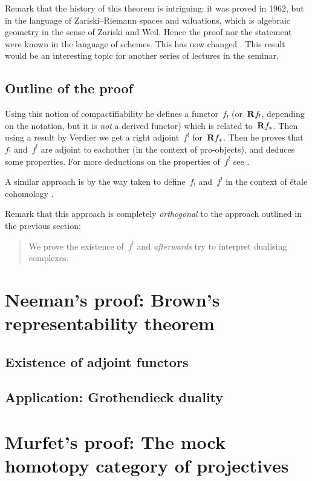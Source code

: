 \documentclass[10pt,a4paper]{article}
\begin{document}
Remark that the history of this theorem is intriguing: it was proved in 1962, but in the language of Zariski--Riemann spaces and valuations, which is algebraic geometry in the sense of Zariski and Weil. Hence the proof nor the statement were known in the language of schemes. This has now changed \cite{lutkebohmert-compactification,conrad-delignes-notes-nagata-compactification,deligne-plongement-de-nagata}. This result would be an interesting topic for another series of lectures in the seminar.

\subsection{Outline of the proof}
Using this notion of compactifiability he defines a functor~$f_!$ (or~$\mathbf{R} f_!$, depending on the notation, but it is \emph{not} a derived functor) which is related to~$\mathbf{R} f_*$. Then using a result by Verdier \cite{verdier-bourbaki-300} we get a right adjoint~$f^!$ for~$\mathbf{R} f_*$. Then he proves that~$f_!$ and~$f^!$ are adjoint to eachother (in the context of pro-objects), and deduces some properties. For more deductions on the properties of~$f^!$ see \cite{verdier-base-change-twisted-inverse-image}.

A similar approach is by the way taken to define~$f_!$ and~$f^!$ in the context of \'etale cohomology \cite[expos\'e XVII]{sga43}.

Remark that this approach is completely \emph{orthogonal} to the approach outlined in the previous section:
\begin{quote}
  We prove the existence of~$f^!$ and \emph{afterwards} try to interpret dualising complexes.
\end{quote}

\section{Neeman's proof: Brown's representability theorem}
\label{section:neeman}
\subsection{Existence of adjoint functors}

\subsection{Application: Grothendieck duality}

\section{Murfet's proof: The mock homotopy category of projectives}
\label{section:murfet}
\end{document}
